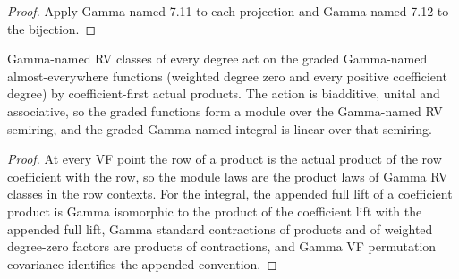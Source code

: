 \begin{proof}


\leanok

Apply Gamma-named 7.11 to each projection and Gamma-named 7.12 to the bijection.

\end{proof}

\begin{theorem}

\label{s7-gn-module}


\leanok

Gamma-named RV classes of every degree act on the graded Gamma-named almost-everywhere functions (weighted degree zero and every positive coefficient degree) by coefficient-first actual products. The action is biadditive, unital and associative, so the graded functions form a module over the Gamma-named RV semiring, and the graded Gamma-named integral is linear over that semiring.

\end{theorem}

\begin{proof}


\leanok

At every VF point the row of a product is the actual product of the row coefficient with the row, so the module laws are the product laws of Gamma RV classes in the row contexts. For the integral, the appended full lift of a coefficient product is Gamma isomorphic to the product of the coefficient lift with the appended full lift, Gamma standard contractions of products and of weighted degree-zero factors are products of contractions, and Gamma VF permutation covariance identifies the appended convention.

\end{proof}

